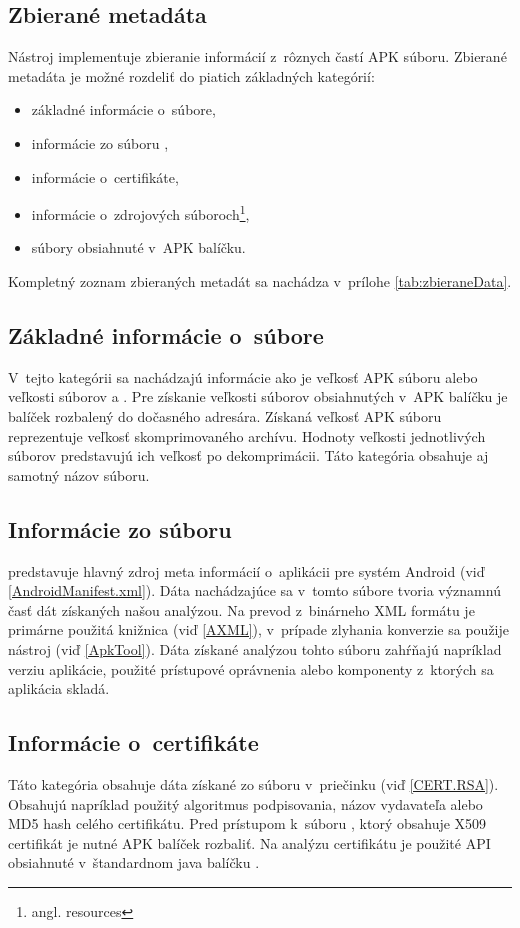 \subsection{Zbierané metadáta}
Nástroj  implementuje zbieranie informácií z~rôznych častí APK súboru. Zbierané metadáta je možné rozdeliť do piatich základných kategórií:
\begin{itemize}
\item základné informácie o~súbore,
\item informácie zo súboru ,
\item informácie o~certifikáte,
\item informácie o~zdrojových súboroch\footnote{angl. resources},
\item súbory obsiahnuté v~APK balíčku.
\end{itemize}

\noindent Kompletný zoznam zbieraných metadát sa nachádza v~prílohe \ref{tab:zbieraneData}.

\subsection*{Základné informácie o~súbore} 
V~tejto kategórii sa nachádzajú informácie ako je veľkosť APK súboru alebo veľkosti súborov  a . Pre získanie veľkosti súborov obsiahnutých v~APK balíčku je balíček rozbalený do dočasného adresára. Získaná veľkosť APK súboru reprezentuje veľkosť skomprimovaného archívu. Hodnoty veľkosti jednotlivých súborov predstavujú ich veľkosť po dekomprimácii. Táto kategória obsahuje aj samotný názov súboru. 
\subsection*{Informácie zo súboru } 
 predstavuje hlavný zdroj meta informácií o~aplikácii pre systém Android (viď \ref{AndroidManifest.xml}). Dáta nachádzajúce sa v~tomto súbore tvoria významnú časť dát získaných našou analýzou. Na prevod z~binárneho XML formátu je primárne použitá knižnica  (viď \ref{AXML}), v~prípade zlyhania konverzie sa použije  nástroj  (viď \ref{ApkTool}). Dáta získané analýzou tohto súboru zahŕňajú napríklad verziu aplikácie, použité prístupové oprávnenia alebo komponenty z~ktorých sa aplikácia skladá.
\subsection*{Informácie o~certifikáte}
Táto kategória obsahuje dáta získané zo súboru  v~priečinku  (viď \ref{CERT.RSA}). Obsahujú napríklad použitý algoritmus podpisovania, názov vydavateľa alebo MD5 hash celého certifikátu. Pred prístupom k~súboru , ktorý obsahuje X509 certifikát je nutné APK balíček rozbaliť. Na analýzu certifikátu je použité API obsiahnuté v~štandardnom java balíčku .
